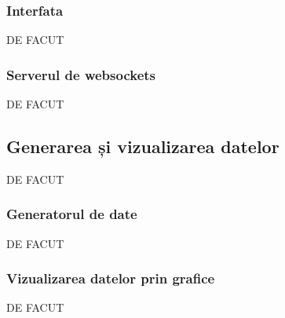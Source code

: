 \documentclass[12pt,a4paper]{article}
\begin{document}
\subsubsection{Interfata}
DE FACUT

\subsubsection{Serverul de websockets}
DE FACUT
\subsection{Generarea și vizualizarea datelor}
DE FACUT
\subsubsection{Generatorul de date}
DE FACUT
\subsubsection{Vizualizarea datelor prin grafice}
DE FACUT
\newpage
\end{document}
